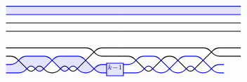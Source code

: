 \begin{figure}[ht]
\[
\begin{tikzcd}[row sep=2pc]
\begin{tikzpicture}[baseline=-.5ex, scale=0.6]
\begin{scope}
\draw[thick] (-7, 0.5) -- ++(7,0) (-7, 1) -- ++(7,0);
\draw[thick, blue] (-7, 1.5) -- ++(7,0) (-7, 2) -- ++(7,0);
\fill[blue, opacity=0.1] (-7, 1.5) -- ++(7,0) -- ++(0, 0.5) -- ++(-7, 0);
%
\draw[thick, rounded corners] (-7, -0.5) -- ++(0.5, 0) -- ++(4.5, 0) -- ++(0.5, -0.5) -- ++(1,0) -- ++(0.5, 0);
\draw[thick, rounded corners] (-7, -1) -- ++(0.5, 0) -- ++(1, -1) -- ++(0.5, 0.5) -- ++(0.5, -0.5) -- ++(0.5, 0) -- ++(0.5, 0.5) -- ++(0.5, -0.5) -- ++(1.5, 1.5) -- ++(1, 0) -- ++(0.5, 0);
\draw[thick, blue, rounded corners] (-7, -1.5) -- ++(0.5, 0) -- ++(0.5, 0.5) -- ++(1.5, 0) -- ++(1, -1) -- ++(0.5, 0.5) -- ++(0.5, -0.5) -- ++(0.5, 0) -- ++(0.5, 0.5) -- ++(0.5, 0);
\draw[thick, blue, rounded corners] (-7, -2) -- ++(0.5, 0) -- ++(0.5, 0) -- ++(0.5, 0.5) -- ++(0.5, -0.5) -- ++(1, 1) -- ++(1.5, 0) -- ++(1, -1) -- ++(0.5, 0);
\draw[thick, blue, fill=blue!10] (-1, -2.175) rectangle ++(1, 0.75) node[pos=.5] {$\scriptstyle k-1$};
\fill[blue, opacity=0.1] (-7, -2) [rounded corners]-- ++(0.5, 0) -- ++(0.5, 0) -- ++(0.5, 0.5) -- ++(0.5, -0.5) [sharp corners]-- ++(0.75, 0.75)
[rounded corners]-- ++(-0.25, 0.25) -- ++(-1.5, 0) -- ++(-0.5, -0.5) -- ++(-0.5, 0);
\fill[blue, opacity=0.1] (-4.25, -1.25) [rounded corners]-- ++(0.25, 0.25) -- ++(1.5, 0) [sharp corners]-- ++(0.75, -0.75)
[rounded corners]-- ++(-0.25, -0.25) -- ++(-0.5, 0) -- ++(-0.5, 0.5) -- ++(-0.5, -0.5) -- ++(-0.75, 0.75);
\fill[blue, opacity=0.1] (-1, -1.5) -- ++(-0.5, 0) -- ++(-0.25, -0.25) -- ++(0.25, -0.25) -- ++(0.5, 0);
\end{scope}
\begin{scope}[xshift=7cm]
\draw[thick] (-7, 0.5) -- ++(7,0) (-7, 1) -- ++(7,0);
\draw[thick, blue] (-7, 1.5) -- ++(7,0) (-7, 2) -- ++(7,0);
\fill[blue, opacity=0.1] (-7, 1.5) -- ++(7,0) -- ++(0, 0.5) -- ++(-7, 0);
%
\draw[thick, rounded corners] (-7, -0.5) -- ++(0.5, 0) -- ++(4.5, 0) -- ++(0.5, -0.5) -- ++(1,0) -- ++(0.5, 0);
\draw[thick, rounded corners] (-7, -1) -- ++(0.5, 0) -- ++(1, -1) -- ++(1, 1) -- ++(0.5, 0) -- ++(1, -1) -- ++(1.5, 1.5) -- ++(1, 0) -- ++(0.5, 0);
\draw[thick, blue, rounded corners] (-7, -1.5) -- ++(0.5, 0) -- ++(0.5, 0.5) -- ++(1, 0) -- ++(1, -1) -- ++(0.5, 0) -- ++(0.5, 0.5) -- ++(0.5, -0.5) -- ++(0.5, 0) -- ++(0.5, 0.5) -- ++(0.5, 0);
\draw[thick, blue, rounded corners] (-7, -2) -- ++(0.5, 0) -- ++(0.5, 0) -- ++(0.5, 0.5) -- ++(0.5, -0.5) -- ++(0.5, 0) -- ++(1, 1) -- ++(1, 0) -- ++(1, -1) -- ++(0.5, 0);

\end{scope}
\end{tikzpicture}
\end{tikzcd}\]
\end{figure}
